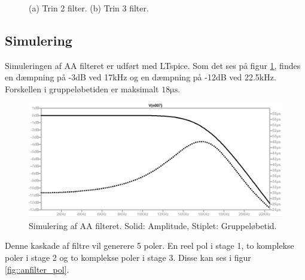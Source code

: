 \begin{figure}[h]
	\centering
	\caption{(a) Trin 2 filter. (b) Trin 3 filter.}
\end{figure}
\FloatBlock
\subsection{Simulering}
Simuleringen af AA filteret er udført med LTspice. Som det ses på figur \ref{fig::anfilter_aasim}, findes en dæmpning på -3dB ved 17kHz og en dæmpning på -12dB ved 22.5kHz. Forskellen i gruppeløbetiden er maksimalt $18 \si{\micro \second}$.
\begin{figure}[h!]
	\centering
	\includegraphics[scale=0.5]{./billeder/aa_sim1}
	\caption{Simulering af AA filteret. Solid: Amplitude, Stiplet: Gruppeløbetid.}
	\label{fig::anfilter_aasim}
\end{figure}
\FloatBlock
Denne kaskade af filtre vil generere 5 poler. En reel pol i stage 1, to komplekse poler i stage 2 og to komplekse poler i stage 3. Disse kan ses i figur \ref{fig::anfilter_pol}.

